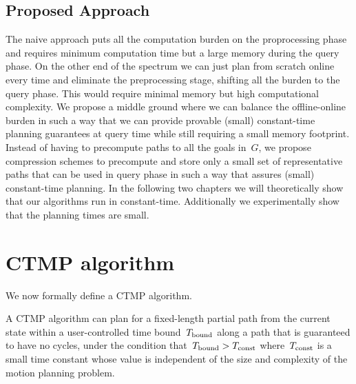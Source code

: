 \documentclass[a4paper]{report}
\begin{document}
\subsection{Proposed Approach}
The naive approach puts all the computation burden on the proprocessing phase and requires minimum computation time but a large memory during the query phase. On the other end of the spectrum we can just plan from scratch online every time and eliminate the preprocessing stage, shifting all the burden to the query phase. This would require minimal memory but high computational complexity. We propose a middle ground where we can balance the offline-online burden in such a way that we can provide provable (small) constant-time planning guarantees at query time while still requiring a small memory footprint. Instead of having to precompute paths to all the goals in~$G$, we propose compression schemes to precompute and store only a small set of representative paths that can be used in query phase in such a way that assures (small) constant-time planning. In the following two chapters we will theoretically show that our algorithms run in constant-time. Additionally we experimentally show that the planning times are small.

\section{CTMP algorithm}
\label{subsec:ctmp_alg}

We now formally define a CTMP algorithm.
%

\vspace{2mm}
\begin{definition}
\label{ctmp:def}
A CTMP algorithm can plan for a fixed-length partial path from the current state within a user-controlled time bound~$T_{\textrm{bound}}$ along a path that is guaranteed to have no cycles, under the condition that~$T_{\textrm{bound}} > T_{\textrm{const}}$ where~$T_{\textrm{const}}$ is a small time constant whose value is independent of the size and complexity of the motion planning problem.
\end{definition}
\end{document}
